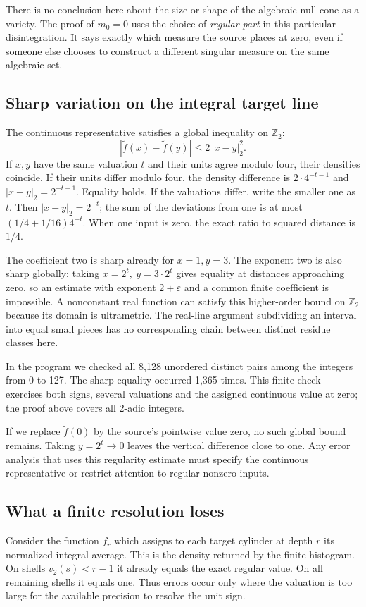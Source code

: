 \documentclass[12pt,letterpaper]{article}
\begin{document}
There is no conclusion here about the size or shape of the algebraic null cone as a variety. The proof of \(m_0=0\) uses the choice of \emph{regular part} in this particular disintegration. It says exactly which measure the source places at zero, even if someone else chooses to construct a different singular measure on the same algebraic set.

\clearpage\subsection{Sharp variation on the integral target line}
The continuous representative satisfies a global inequality on \(\mathbb Z_2\):
\[
      |\widetilde f(x)-\widetilde f(y)|\le 2\,|x-y|_2^2 .
\]
If \(x,y\) have the same valuation \(t\) and their units agree modulo four, their densities coincide. If their units differ modulo four, the density difference is \(2\cdot4^{-t-1}\) and \(|x-y|_2=2^{-t-1}\). Equality holds. If the valuations differ, write the smaller one as \(t\). Then \(|x-y|_2=2^{-t}\); the sum of the deviations from one is at most \((1/4+1/16)4^{-t}\). When one input is zero, the exact ratio to squared distance is \(1/4\).

The coefficient two is sharp already for \(x=1,y=3\). The exponent two is also sharp globally: taking \(x=2^t,\ y=3\cdot2^t\) gives equality at distances approaching zero, so an estimate with exponent \(2+\varepsilon\) and a common finite coefficient is impossible. A nonconstant real function can satisfy this higher-order bound on \(\mathbb Z_2\) because its domain is ultrametric. The real-line argument subdividing an interval into equal small pieces has no corresponding chain between distinct residue classes here.

In the program we checked all 8,128 unordered distinct pairs among the integers from 0 to 127. The sharp equality occurred 1,365 times. This finite check exercises both signs, several valuations and the assigned continuous value at zero; the proof above covers all 2-adic integers.

If we replace \(\widetilde f(0)\) by the source's pointwise value zero, no such global bound remains. Taking \(y=2^t\to0\) leaves the vertical difference close to one. Any error analysis that uses this regularity estimate must specify the continuous representative or restrict attention to regular nonzero inputs.

\clearpage\subsection{What a finite resolution loses}
Consider the function \(f_r\) which assigns to each target cylinder at depth \(r\) its normalized integral average. This is the density returned by the finite histogram. On shells \(v_2(s)<r-1\) it already equals the exact regular value. On all remaining shells it equals one. Thus errors occur only where the valuation is too large for the available precision to resolve the unit sign.
\end{document}
